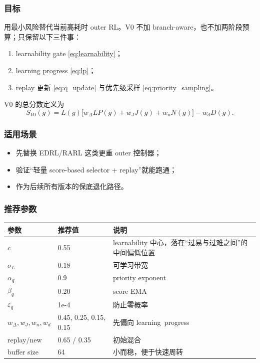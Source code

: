 \documentclass[11pt,a4paper]{ctexart}
\begin{document}
\subsubsection*{目标}
用最小风险替代当前高耗时 outer RL。V0 不加 branch-aware，也不加两阶段预算；只保留以下三件事：
\begin{enumerate}[leftmargin=2.2em,itemsep=0.25em]
    \item learnability gate \eqref{eq:learnability}；
    \item learning progress \eqref{eq:lp}；
    \item replay 更新 \eqref{eq:q_update} 与优先级采样 \eqref{eq:priority_sampling}。
\end{enumerate}

V0 的总分数定义为
\begin{equation}
S_{V0}(g)=L(g)\big[w_\Delta LP(g)+w_J J(g)+w_n N(g)\big]-w_d D(g).
\label{eq:sv0}
\end{equation}

\subsubsection*{适用场景}
\begin{itemize}[leftmargin=2.2em,itemsep=0.2em]
    \item 先替换 EDRL/RARL 这类更重 outer 控制器；
    \item 验证“轻量 score-based selector + replay”就能跑通；
    \item 作为后续所有版本的保底退化路径。
\end{itemize}

\subsubsection*{推荐参数}
\begin{center}
\begin{tabular}{p{4.0cm}p{3.0cm}p{6.4cm}}
\toprule
参数 & 推荐值 & 说明 \\
\midrule
\(c\) & 0.55 & learnability 中心，落在“过易与过难之间”的中间偏低位置 \\
\(\sigma_L\) & 0.18 & 可学习带宽 \\
\(\alpha_q\) & 0.9 & priority exponent \\
\(\beta_q\) & 0.20 & score EMA \\
\(\varepsilon_q\) & 1e-4 & 防止零概率 \\
\(w_\Delta,w_J,w_n,w_d\) & 0.45, 0.25, 0.15, 0.15 & 先偏向 learning\ progress \\
replay/new & 0.65 / 0.35 & 初始混合 \\
buffer size & 64 & 小而稳，便于快速周转 \\
\bottomrule
\end{tabular}
\end{center}
\end{document}
